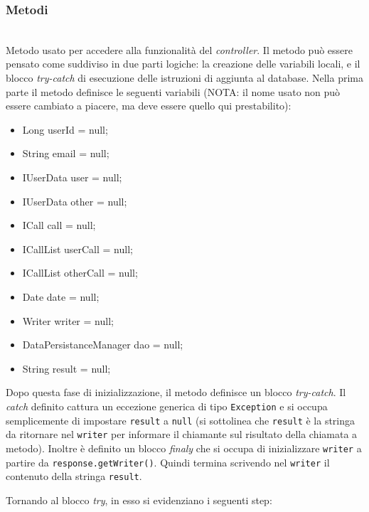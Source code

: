 \subsubsection*{Metodi}
\begin{description}
	
	\item{}\\
	Metodo usato per accedere alla funzionalità del \textit{controller}. Il metodo può essere pensato come suddiviso in due parti logiche: la creazione delle variabili locali, e il blocco \textit{try-catch} di esecuzione delle istruzioni di aggiunta al database. Nella prima parte il metodo definisce le seguenti variabili (NOTA: il nome usato non può essere cambiato a piacere, ma deve essere quello qui prestabilito):
	
	\begin{itemize}
		\item Long userId = null;
		\item String email = null;
		\item IUserData user = null;
		\item IUserData other = null;
		\item ICall call = null;
		\item ICallList userCall = null;
		\item ICallList otherCall = null;
		\item Date date = null;
		\item Writer writer = null;
		\item DataPersistanceManager dao = null;
		\item String result = null;
	\end{itemize}

Dopo questa fase di inizializzazione, il metodo definisce un blocco \textit{try-catch}. Il \textit{catch} definito cattura un eccezione generica di tipo \texttt{Exception} e si occupa semplicemente di impostare \texttt{result} a \texttt{null} (si sottolinea che \texttt{result} è la stringa da ritornare nel \texttt{writer} per informare il chiamante sul risultato della chiamata a metodo). Inoltre è definito un blocco \textit{finaly} che si occupa di inizializzare \texttt{writer} a partire da \texttt{response.getWriter()}. Quindi termina scrivendo nel \texttt{writer} il contenuto della stringa \texttt{result}.

Tornando al blocco \textit{try}, in esso si evidenziano i seguenti step:


\end{description}
